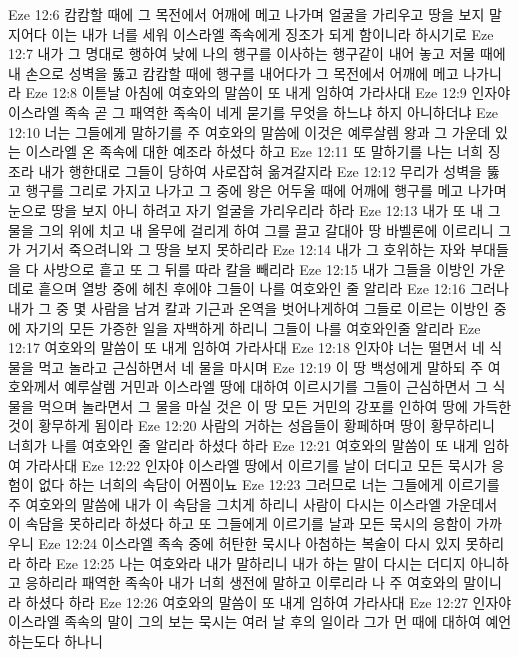 Eze 12:6  캄캄할 때에 그 목전에서 어깨에 메고 나가며 얼굴을 가리우고 땅을 보지 말지어다 이는 내가 너를 세워 이스라엘 족속에게 징조가 되게 함이니라 하시기로
Eze 12:7  내가 그 명대로 행하여 낮에 나의 행구를 이사하는 행구같이 내어 놓고 저물 때에 내 손으로 성벽을 뚫고 캄캄할 때에 행구를 내어다가 그 목전에서 어깨에 메고 나가니라
Eze 12:8  이튿날 아침에 여호와의 말씀이 또 내게 임하여 가라사대
Eze 12:9  인자야 이스라엘 족속 곧 그 패역한 족속이 네게 묻기를 무엇을 하느냐 하지 아니하더냐
Eze 12:10  너는 그들에게 말하기를 주 여호와의 말씀에 이것은 예루살렘 왕과 그 가운데 있는 이스라엘 온 족속에 대한 예조라 하셨다 하고
Eze 12:11  또 말하기를 나는 너희 징조라 내가 행한대로 그들이 당하여 사로잡혀 옮겨갈지라
Eze 12:12  무리가 성벽을 뚫고 행구를 그리로 가지고 나가고 그 중에 왕은 어두울 때에 어깨에 행구를 메고 나가며 눈으로 땅을 보지 아니 하려고 자기 얼굴을 가리우리라 하라
Eze 12:13  내가 또 내 그물을 그의 위에 치고 내 올무에 걸리게 하여 그를 끌고 갈대아 땅 바벨론에 이르리니 그가 거기서 죽으려니와 그 땅을 보지 못하리라
Eze 12:14  내가 그 호위하는 자와 부대들을 다 사방으로 흩고 또 그 뒤를 따라 칼을 빼리라
Eze 12:15  내가 그들을 이방인 가운데로 흩으며 열방 중에 헤친 후에야 그들이 나를 여호와인 줄 알리라
Eze 12:16  그러나 내가 그 중 몇 사람을 남겨 칼과 기근과 온역을 벗어나게하여 그들로 이르는 이방인 중에 자기의 모든 가증한 일을 자백하게 하리니 그들이 나를 여호와인줄 알리라
Eze 12:17  여호와의 말씀이 또 내게 임하여 가라사대
Eze 12:18  인자야 너는 떨면서 네 식물을 먹고 놀라고 근심하면서 네 물을 마시며
Eze 12:19  이 땅 백성에게 말하되 주 여호와께서 예루살렘 거민과 이스라엘 땅에 대하여 이르시기를 그들이 근심하면서 그 식물을 먹으며 놀라면서 그 물을 마실 것은 이 땅 모든 거민의 강포를 인하여 땅에 가득한 것이 황무하게 됨이라
Eze 12:20  사람의 거하는 성읍들이 황페하며 땅이 황무하리니 너희가 나를 여호와인 줄 알리라 하셨다 하라
Eze 12:21  여호와의 말씀이 또 내게 임하여 가라사대
Eze 12:22  인자야 이스라엘 땅에서 이르기를 날이 더디고 모든 묵시가 응험이 없다 하는 너희의 속담이 어찜이뇨
Eze 12:23  그러므로 너는 그들에게 이르기를 주 여호와의 말씀에 내가 이 속담을 그치게 하리니 사람이 다시는 이스라엘 가운데서 이 속담을 못하리라 하셨다 하고 또 그들에게 이르기를 날과 모든 묵시의 응함이 가까우니
Eze 12:24  이스라엘 족속 중에 허탄한 묵시나 아첨하는 복술이 다시 있지 못하리라 하라
Eze 12:25  나는 여호와라 내가 말하리니 내가 하는 말이 다시는 더디지 아니하고 응하리라 패역한 족속아 내가 너희 생전에 말하고 이루리라 나 주 여호와의 말이니라 하셨다 하라
Eze 12:26  여호와의 말씀이 또 내게 임하여 가라사대
Eze 12:27  인자야 이스라엘 족속의 말이 그의 보는 묵시는 여러 날 후의 일이라 그가 먼 때에 대하여 예언하는도다 하나니
